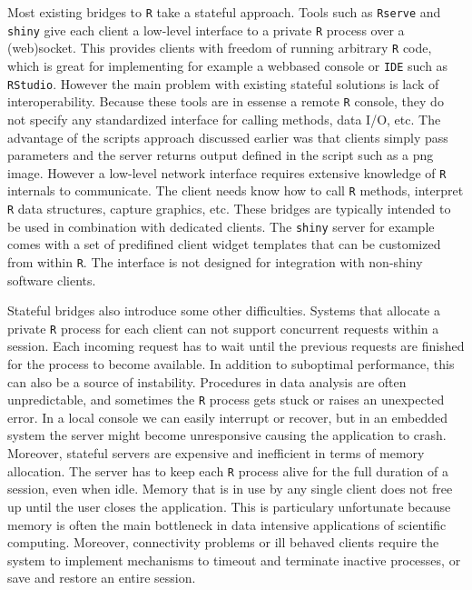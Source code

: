\documentclass{article}
\newcommand{\R}{\texttt{R}\xspace}
\begin{document}
Most existing bridges to \R take a stateful approach. Tools such as \texttt{Rserve} \citep{urbanek2013rserve} and \texttt{shiny} \citep{shiny} give each client a low-level interface to a private \R process over a (web)socket. This provides clients with freedom of running arbitrary \R code, which is great for implementing for example a webbased console or \texttt{IDE} such as \texttt{RStudio}. However the main problem with existing stateful solutions is lack of interoperability. Because these tools are in essense a remote \R console, they do not specify any standardized interface for calling methods, data I/O, etc. The advantage of the scripts approach discussed earlier was that clients simply pass parameters and the server returns output defined in the script such as a png image. However a low-level network interface requires extensive knowledge of \R internals to communicate. The client needs know how to call \R methods, interpret \R data structures, capture graphics, etc. These bridges are typically intended to be used in combination with dedicated clients. The \texttt{shiny} server for example comes with a set of predifined client widget templates that can be customized from within \R. The interface is not designed for integration with non-shiny software clients.

Stateful bridges also introduce some other difficulties. Systems that allocate a private \R process for each client can not support concurrent requests within a session. Each incoming request has to wait until the previous requests are finished for the process to become available. In addition to suboptimal performance, this can also be a source of instability. Procedures in data analysis are often unpredictable, and sometimes the \R process gets stuck or raises an unexpected error. In a local console we can easily interrupt or recover, but in an embedded system the server might become unresponsive causing the application to crash. Moreover, stateful servers are expensive and inefficient in terms of memory allocation. The server has to keep each \R process alive for the full duration of a session, even when idle. Memory that is in use by any single client does not free up until the user closes the application. This is particulary unfortunate because memory is often the main bottleneck in data intensive applications of scientific computing. Moreover, connectivity problems or ill behaved clients require the system to implement mechanisms to timeout and terminate inactive processes, or save and restore an entire session.
\end{document}
